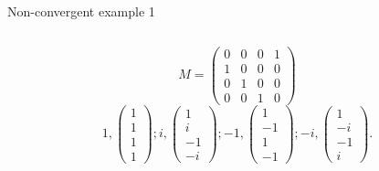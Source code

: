 \documentclass[10pt]{beamer}
\begin{document}
\begin{frame}{Non-convergent example 1}
\begin{columns}
\begin{column}{0.6\textwidth}
\begin{center}
      \end{center}
      \[
        M =
        \begin{pmatrix}
          0 & 0 & 0 & 1\\
          1 & 0 & 0 & 0\\
          0 & 1 & 0 & 0\\
          0 & 0 & 1 & 0
        \end{pmatrix}
      \]
      \[
        1,
        \begin{pmatrix}1\\1\\1\\1
        \end{pmatrix};
        i,
        \begin{pmatrix}1\\i\\-1\\-i
        \end{pmatrix};
        -1,
        \begin{pmatrix}1\\-1\\1\\-1
        \end{pmatrix};
        -i,
        \begin{pmatrix}1\\-i\\-1\\i
        \end{pmatrix}.
      \]
    \end{column}
  \end{columns}
\end{frame}
\end{document}
